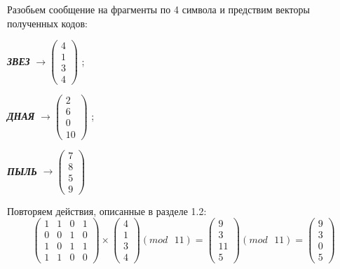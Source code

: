 \documentclass[a5paper, 10pt]{article}
\theoremstyle{definition}
\theoremstyle{plain}
\theoremstyle{remark}
\begin{document}
Разобьем сообщение на фрагменты по 4 символа и предствим векторы полученных кодов:
\begin{center}
\textbf{\textit{ЗВЕЗ}} $\to \begin{pmatrix}
 4\\
1\\
3\\
4
\end{pmatrix}$ ;

\textbf{\textit{ДНАЯ}}  $\to \begin{pmatrix}
 2\\
6\\
0\\
10
\end{pmatrix}$ ;

\textbf{\textit{ПЫЛЬ}}  $\to \begin{pmatrix}
7\\
8\\
 5\\
9
\end{pmatrix}$ \\
\end{center}
Повторяем действия, описанные в разделе 1.2:
\begin{equation}
\begin{pmatrix}
1 & 1 & 0 & 1\\
0 & 0 & 1 & 0 \\
1 & 0 & 1 & 1 \\
1 & 1 & 0 & 0
\end{pmatrix}
 \times
\begin{pmatrix}
 4\\
1\\
3\\
4
\end{pmatrix}
(mod \text{ }11)
= 
\begin{pmatrix}
9\\
3\\
11\\
5
\end{pmatrix}
(mod \text{ }11)
= \begin{pmatrix}
9\\
3\\
0\\
5
\end{pmatrix}
\end{equation}
\end{document}
